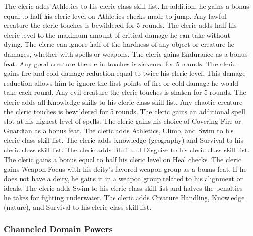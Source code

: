 The cleric adds Athletics to his cleric class skill list. In addition, he gains a bonus equal to half his cleric level on Athletics checks made to jump.
 Any lawful creature the cleric touches is bewildered for 5 rounds.
 The cleric adds half his cleric level to the maximum amount of critical damage he can take without dying.
 The cleric can ignore half of the hardness of any object or creature he damages, whether with spells or weapons.
 The cleric gains Endurance as a bonus feat.
 Any good creature the cleric touches is sickened for 5 rounds.
 The cleric gains fire and cold damage reduction equal to twice his cleric level. This damage reduction allows him to ignore the first points of fire or cold damage he would take each round.
 Any evil creature the cleric touches is shaken for 5 rounds.
 The cleric adds all Knowledge skills to his cleric class skill list.
 Any chaotic creature the cleric touches is bewildered for 5 rounds.
 The cleric gains an additional spell slot at his highest level of spells.
 The cleric gains his choice of Covering Fire or Guardian as a bonus feat.
 The cleric adds Athletics, Climb, and Swim to his cleric class skill list.
 The cleric adds Knowledge (geography) and Survival to his cleric class skill list.
 The cleric adds Bluff and Disguise to his cleric class skill list.
 The cleric gains a bonus equal to half his cleric level on Heal checks.
 The cleric gains Weapon Focus with his deity's favored weapon group as a bonus feat. If he does not have a deity, he gains it in a weapon group related to his alignment or ideals.
 The cleric adds Swim to his cleric class skill list and halves the penalties he takes for fighting underwater.
 The cleric adds Creature Handling, Knowledge (nature), and Survival to his cleric class skill list.

\subsubsection{Channeled Domain Powers}\label{Channeled Domain Powers}

